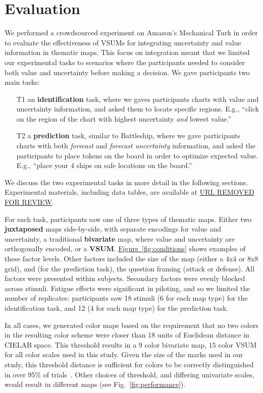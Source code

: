 \documentclass{vgtc}                          %
\newcommand{\figref}[1]{\hyperref[#1]{Figure~\ref*{#1}}}
\begin{document}
\section{Evaluation}

\conditionFig

We performed a crowdsourced experiment on Amazon's Mechanical Turk in order to evaluate the effectiveness of VSUMs for integrating uncertainty and value information in thematic maps. This focus on integration meant that we limited our experimental tasks to scenarios where the participants needed to consider both value and uncertainty before making a decision. We gave participants two main tasks:

\begin{enumerate}
	\item [T1] an \textbf{identification} task, where we gaves participants charts with value and uncertainty information, and asked them to locate specific regions. E.g., ``click on the region of the chart with highest uncertainty \emph{and} lowest value.''
	\item [T2] a \textbf{prediction} task, similar to Battleship, where we gave participants charts with both \emph{forecast} and \emph{forecast uncertainty} information, and asked the participants to place tokens on the board in order to optimize expected value. E.g., ``place your $4$ ships on safe locations on the board.''
\end{enumerate}

We discuss the two experimental tasks in more detail in the following sections. Experimental materials, including data tables, are available at \url{URL REMOVED FOR REVIEW}.

For each task, participants saw one of three types of thematic maps. Either two \textbf{juxtaposed} maps side-by-side, with separate encodings for value and uncertainty, a traditional \textbf{bivariate} map, where value and uncertainty are orthogonally encoded, or a \textbf{VSUM}. \figref{fig:conditions} shows examples of these factor levels. Other factors included the size of the map (either a 4x4 or 8x8 grid), and (for the prediction task), the question framing (attack or defense). All factors were presented within subjects. Secondary factors were evenly blocked across stimuli. Fatigue effects were significant in piloting, and so we limited the number of replicates: participants saw 18 stimuli (6 for each map type) for the identification task, and 12 (4 for each map type) for the prediction task. 

In all cases, we generated color maps based on the requirement that no two colors in the resulting color scheme were closer than 18 units of Euclidean distance in CIELAB space. This threshold results in a $9$ color bivariate map, $15$ color VSUM for all color scales used in this study. Given the size of the marks used in our study, this threshold distance is sufficient for colors to be correctly distinguished in over 95\% of trials~\cite{stone2014engineering}. Other choices of threshold, and differing univariate scales, would result in different maps (see Fig.~\ref{fig:performance}). 
\end{document}
